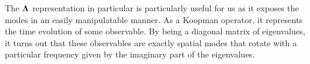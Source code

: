 The $\bf \Lambda$ representation in particular is particularly useful for us as it exposes the modes in an easily manipulatable manner. As a Koopman operator, it represents the time evolution of some observable. By being a diagonal matrix of eigenvalues, it turns out that these observables are exactly spatial modes that rotate with a particular frequency given by the imaginary part of the eigenvalues.